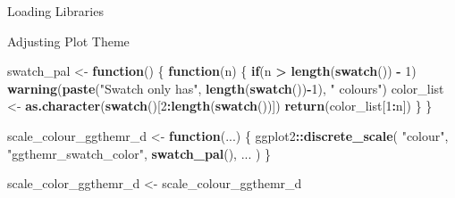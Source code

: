 \documentclass[
]{article}
\newenvironment{Shaded}{\begin{snugshade}}{\end{snugshade}}
\newcommand{\ControlFlowTok}[1]{\textcolor[rgb]{0.13,0.29,0.53}{\textbf{#1}}}
\newcommand{\DataTypeTok}[1]{\textcolor[rgb]{0.13,0.29,0.53}{#1}}
\newcommand{\DecValTok}[1]{\textcolor[rgb]{0.00,0.00,0.81}{#1}}
\newcommand{\KeywordTok}[1]{\textcolor[rgb]{0.13,0.29,0.53}{\textbf{#1}}}
\newcommand{\NormalTok}[1]{#1}
\newcommand{\OperatorTok}[1]{\textcolor[rgb]{0.81,0.36,0.00}{\textbf{#1}}}
\newcommand{\OtherTok}[1]{\textcolor[rgb]{0.56,0.35,0.01}{#1}}
\newcommand{\StringTok}[1]{\textcolor[rgb]{0.31,0.60,0.02}{#1}}
\begin{document}
Loading Libraries

\begin{Shaded}
\end{Shaded}

Adjusting Plot Theme

\begin{Shaded}
\begin{Highlighting}[]
\NormalTok{swatch_pal <-}\StringTok{ }\ControlFlowTok{function}\NormalTok{() \{}
  \ControlFlowTok{function}\NormalTok{(n) \{}
    \ControlFlowTok{if}\NormalTok{(n }\OperatorTok{>}\StringTok{ }\KeywordTok{length}\NormalTok{(}\KeywordTok{swatch}\NormalTok{()) }\OperatorTok{-}\StringTok{ }\DecValTok{1}\NormalTok{) }
      \KeywordTok{warning}\NormalTok{(}\KeywordTok{paste}\NormalTok{(}\StringTok{"Swatch only has"}\NormalTok{,}
        \KeywordTok{length}\NormalTok{(}\KeywordTok{swatch}\NormalTok{())}\OperatorTok{-}\DecValTok{1}\NormalTok{), }\StringTok{" colours"}\NormalTok{)}
\NormalTok{    color_list <-}\StringTok{ }\KeywordTok{as.character}\NormalTok{(}\KeywordTok{swatch}\NormalTok{()[}\DecValTok{2}\OperatorTok{:}\KeywordTok{length}\NormalTok{(}\KeywordTok{swatch}\NormalTok{())])}
    \KeywordTok{return}\NormalTok{(color_list[}\DecValTok{1}\OperatorTok{:}\NormalTok{n])}
\NormalTok{  \}}
\NormalTok{\}}

\NormalTok{scale_colour_ggthemr_d <-}\StringTok{ }\ControlFlowTok{function}\NormalTok{(...) \{}
\NormalTok{  ggplot2}\OperatorTok{::}\KeywordTok{discrete_scale}\NormalTok{(}
             \StringTok{"colour"}\NormalTok{, }\StringTok{"ggthemr_swatch_color"}\NormalTok{,}
             \KeywordTok{swatch_pal}\NormalTok{(),}
\NormalTok{             ...}
\NormalTok{           )}
\NormalTok{\}}

\NormalTok{scale_color_ggthemr_d <-}\StringTok{ }\NormalTok{scale_colour_ggthemr_d}
\end{Highlighting}
\end{Shaded}
\end{document}
